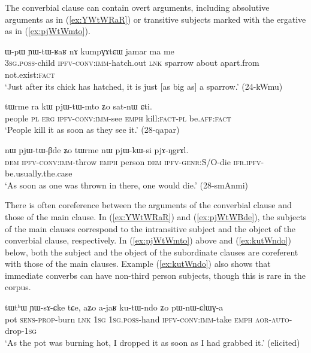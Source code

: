 The converbial clause can contain overt arguments, including  absolutive arguments as in (\ref{ex:YWtWRaR}) or transitive subjects marked with the ergative as in (\ref{ex:pjWtWmto}). 
\largerpage
\begin{exe}
\ex \label{ex:YWtWRaR} 
\gll  ɯ-pɯ ɲɯ-tɯ-ʁaʁ nɤ kumpɣɤtɕɯ jamar ma me	\\
\textsc{3sg}.\textsc{poss}-child \textsc{ipfv}-\textsc{conv}:\textsc{imm}-hatch.out \textsc{lnk} sparrow about apart.from not.exist:\textsc{fact} \\
\glt `Just after its chick has hatched, it is just [as big as] a sparrow.' (24-kWmu) 
\end{exe}

\begin{exe}
\ex \label{ex:pjWtWmto}
\gll tɯrme ra kɯ pjɯ-tɯ-mto ʑo sat-nɯ ɕti.    \\
people \textsc{pl} \textsc{erg} \textsc{ipfv}-\textsc{conv}:\textsc{imm}-see \textsc{emph} kill:\textsc{fact}-\textsc{pl} be.\textsc{aff}:\textsc{fact} \\
\glt  `People kill it as soon as they see it.' (28-qapar)
\end{exe}


\begin{exe}
\ex \label{ex:pjWtWBde} 
\gll nɯ pjɯ-tɯ-βde ʑo tɯrme nɯ pjɯ-kɯ-si pjɤ-ŋgrɤl. \\
\textsc{dem} \textsc{ipfv}-\textsc{conv}:\textsc{imm}-throw \textsc{emph} person \textsc{dem} \textsc{ipfv}-\textsc{genr}:S/O-die \textsc{ifr}.\textsc{ipfv}-be.usually.the.case \\
\glt `As soon as one was thrown in there, one would die.' (28-smAnmi) 
\end{exe}

There is often coreference between the arguments of the converbial clause and those of the main clause. In (\ref{ex:YWtWRaR}) and (\ref{ex:pjWtWBde}), the subjects of the main clauses correspond to the intransitive subject and the object of the converbial clause, respectively. In (\ref{ex:pjWtWmto}) above and (\ref{ex:kutWndo}) below, both the subject and the object of the subordinate clauses are coreferent with those of the main clauses. Example (\ref{ex:kutWndo}) also shows that immediate converbs can have non-third person subjects, though this is rare in the corpus.

\begin{exe}
\ex \label{ex:kutWndo} 
\gll tɯtʰɯ ɲɯ-sɤ-ɕke tɕe, aʑo a-jaʁ ku-tɯ-ndo ʑo pɯ-nɯ-ɕlɯɣ-a \\
pot \textsc{sens}-\textsc{prop}-burn \textsc{lnk} \textsc{1sg} \textsc{1sg}.\textsc{poss}-hand \textsc{ipfv}-\textsc{conv}:\textsc{imm}-take \textsc{emph} \textsc{aor}-\textsc{auto}-drop-\textsc{1sg} \\
\glt `As the pot was burning hot, I dropped it as soon as I had grabbed it.' (elicited)
\end{exe}

